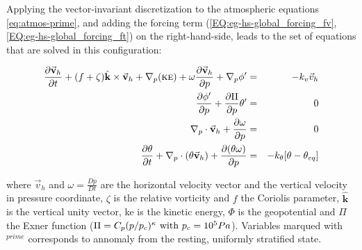 Applying the vector-invariant discretization to the
atmospheric equations \ref{eq:atmos-prime}, and adding the 
forcing term 
(\ref{EQ:eg-hs-global_forcing_fv}, \ref{EQ:eg-hs-global_forcing_ft})
on the right-hand-side,
leads to the set of equations that are solved in this configuration:


\begin{eqnarray}
\label{EQ:eg-hs-model_equations}
\frac{\partial \vec{\mathbf{v}}_h}{\partial t}
+(f + \zeta)\hat{\mathbf{k}} \times \vec{\mathbf{v}}_h
+\mathbf{\nabla }_{p} (\mbox{\sc ke})
+ \omega \frac{\partial \vec{\mathbf{v}}_h }{\partial p}
+\mathbf{\nabla }_p \phi ^{\prime } 
&=& 
-k_v\vec{v}_h
\\
\frac{\partial \phi ^{\prime }}{\partial p} 
+\frac{\partial \Pi }{\partial p}\theta ^{\prime } &=&0
\\
\mathbf{\nabla }_{p}\cdot \vec{\mathbf{v}}_h+\frac{\partial \omega }{
\partial p} &=&0
\\
\frac{\partial \theta }{\partial t} 
+ \mathbf{\nabla }_{p}\cdot (\theta \vec{\mathbf{v}}_h)
+ \frac{\partial (\theta \omega)}{\partial p}
&=& -k_{\theta}[\theta-\theta_{eq}]
\end{eqnarray}


\noindent where $\vec{v}_h$ and $\omega = \frac{Dp}{Dt}$ are the horizontal 
velocity vector and the vertical velocity in pressure coordinate,
$\zeta$ is the relative vorticity and $f$ the Coriolis parameter, 
$\hat{\mathbf{k}}$ is the vertical unity vector, 
{\sc ke} is the kinetic energy, $\Phi$ is the geopotential
and $\Pi$ the Exner function 
($\Pi = C_p (p/p_c)^\kappa ~{\rm with}~ p_c = 10^5 Pa$).
Variables marqued with $^{prime}$ corresponds to annomaly from 
the resting, uniformly stratified state.

